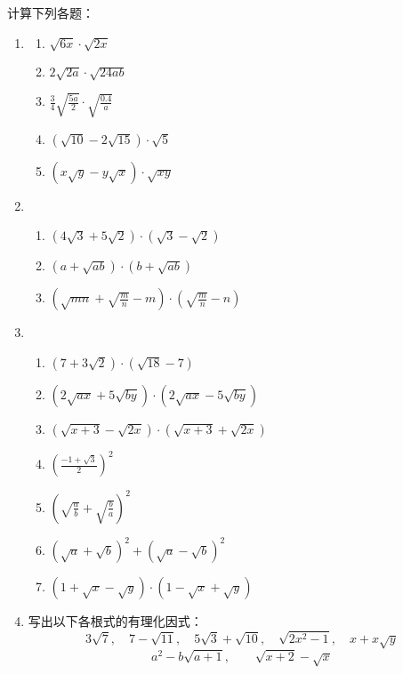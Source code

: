 \begin{ex}
    计算下列各题：
\begin{enumerate}
    \item \begin{multicols}{2}
\begin{enumerate}
    \item $\sqrt{6x}\cdot \sqrt{2x}$
    \item $2\sqrt{2a}\cdot \sqrt{24ab}$
    \item $\frac{3}{4}\sqrt{\frac{5a}{2}}\cdot \sqrt{\frac{0.4}{a}}$
    \item $\left(\sqrt{10}-2\sqrt{15}\right)\cdot \sqrt{5}$
    \item $\left(x\sqrt{y}-y\sqrt{x}\right)\cdot \sqrt{xy}$
\end{enumerate}
    \end{multicols}
\item \begin{enumerate}
    \item $\left(4\sqrt{3}+5\sqrt{2}\right)\cdot \left(\sqrt{3}-\sqrt{2}\right)$
    \item $(a+\sqrt{ab})\cdot (b+\sqrt{ab})$
    \item $\left(\sqrt{mn}+\sqrt{\frac{m}{n}}-m\right)\cdot \left(\sqrt{\frac{m}{n}}-n\right)$
\end{enumerate}

\item \begin{enumerate}
    \item $\left(7+3\sqrt{2}\right)\cdot \left(\sqrt{18}-7\right)$
    \item $\left(2\sqrt{ax}+5\sqrt{by}\right)\cdot \left(2\sqrt{ax}-5\sqrt{by}\right)$
    \item $\left(\sqrt{x+3}-\sqrt{2x}\right)\cdot \left(\sqrt{x+3}+\sqrt{2x}\right)$
    \item $\left(\frac{-1+\sqrt{3}}{2}\right)^2$
    \item $\left(\sqrt{\frac{a}{b}}+\sqrt{\frac{b}{a}}\right)^2$
    \item $\left(\sqrt{a}+\sqrt{b}\right)^2+\left(\sqrt{a}-\sqrt{b}\right)^2$
    \item $\left(1+\sqrt{x}-\sqrt{y}\right)\cdot \left(1-\sqrt{x}+\sqrt{y}\right)$

\end{enumerate}

\item 写出以下各根式的有理化因式：
\[3\sqrt{7},\quad 7-\sqrt{11},\quad 5\sqrt{3}+\sqrt{10},\quad \sqrt{2x^2-1},\quad x+x\sqrt{y}\]
\[a^2-b\sqrt{a+1},\qquad \sqrt{x+2}-\sqrt{x}\]
\end{enumerate}
\end{ex}

